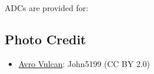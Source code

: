 ADCs are provided for:
\begin{itemize}
\end{itemize}

\subsection{Photo Credit}
\begin{itemize}\raggedright
    \item \href{https://commons.wikimedia.org/wiki/File:Avro_Vulcan_XH558_Duxford_Airshow_2012_(7977149648).jpg}{Avro Vulcan}: John5199 (CC BY 2.0)
\end{itemize}
